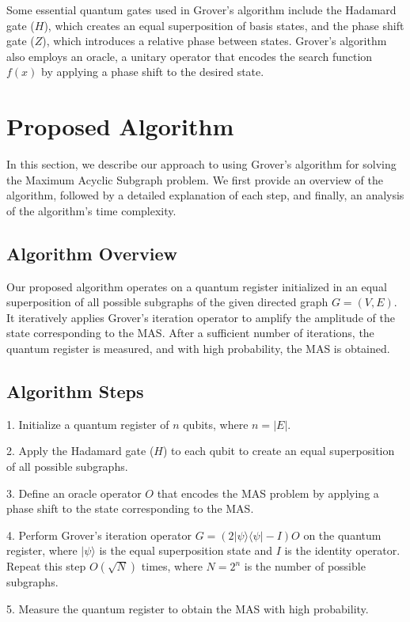 Some essential quantum gates used in Grover's algorithm include the Hadamard gate ($H$), which creates an equal superposition of basis states, and the phase shift gate ($Z$), which introduces a relative phase between states. Grover's algorithm also employs an oracle, a unitary operator that encodes the search function $f(x)$ by applying a phase shift to the desired state.

\section{Proposed Algorithm}
\label{sec:algorithm}
In this section, we describe our approach to using Grover's algorithm for solving the Maximum Acyclic Subgraph problem. We first provide an overview of the algorithm, followed by a detailed explanation of each step, and finally, an analysis of the algorithm's time complexity.

\subsection{Algorithm Overview}
Our proposed algorithm operates on a quantum register initialized in an equal superposition of all possible subgraphs of the given directed graph $G = (V, E)$. It iteratively applies Grover's iteration operator to amplify the amplitude of the state corresponding to the MAS. After a sufficient number of iterations, the quantum register is measured, and with high probability, the MAS is obtained.

\subsection{Algorithm Steps}
1. Initialize a quantum register of $n$ qubits, where $n = |E|$.

2. Apply the Hadamard gate ($H$) to each qubit to create an equal superposition of all possible subgraphs.

3. Define an oracle operator $O$ that encodes the MAS problem by applying a phase shift to the state corresponding to the MAS.

4. Perform Grover's iteration operator $G = (2|\psi\rangle\langle\psi| - I)O$ on the quantum register, where $|\psi\rangle$ is the equal superposition state and $I$ is the identity operator. Repeat this step $O(\sqrt{N})$ times, where $N = 2^n$ is the number of possible subgraphs.

5. Measure the quantum register to obtain the MAS with high probability.

